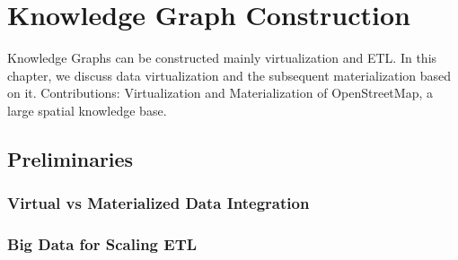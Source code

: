 
\chapter{Knowledge Graph Construction}

Knowledge Graphs can be constructed mainly virtualization and ETL.
In this chapter, we discuss data virtualization and the subsequent materialization based on it.
Contributions: Virtualization and Materialization of OpenStreetMap, a large spatial knowledge base.



\section{Preliminaries}
\subsection{Virtual vs Materialized Data Integration}

\subsection{Big Data for Scaling ETL}

